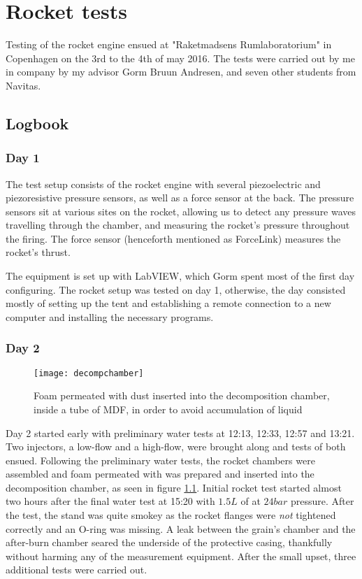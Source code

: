 \chapter{Rocket tests}

Testing of the rocket engine ensued at "Raketmadsens Rumlaboratorium" in Copenhagen on the 3rd to the 4th of may 2016. The tests were carried out by me in company by my advisor Gorm Bruun Andresen, and seven other students from Navitas.

\section{Logbook}

	\subsection{Day 1}

		The test setup consists of the rocket engine with several piezoelectric and piezoresistive pressure sensors, as well as a force sensor at the back. The pressure sensors sit at various sites on the rocket, allowing us to detect any pressure waves travelling through the chamber, and measuring the rocket's pressure throughout the firing. The force sensor (henceforth mentioned as ForceLink) measures the rocket's thrust.

		The equipment is set up with LabVIEW, which Gorm spent most of the first day configuring. The rocket setup was tested on day 1, otherwise, the day consisted mostly of setting up the tent and establishing a remote connection to a new computer and installing the necessary programs.

	\subsection{Day 2}

		\begin{figure}
			\centering
			\texttt{[image: decompchamber]}
			\caption{Foam permeated with  dust inserted into the decomposition chamber, inside a tube of MDF, in order to avoid accumulation of liquid }
			\label{fig:kmno4foam}
		\end{figure}

		Day 2 started early with preliminary water tests at 12:13, 12:33, 12:57 and 13:21. Two injectors, a low-flow and a high-flow, were brought along and tests of both ensued. Following the preliminary water tests, the rocket chambers were assembled and foam permeated with  was prepared and inserted into the decomposition chamber, as seen in figure \ref{fig:kmno4foam}. Initial rocket test started almost two hours after the final water test at 15:20 with $\si{1.5}{L}$ of  at $\si{24}{bar}$ pressure. After the test, the stand was quite smokey as the rocket flanges were \emph{not} tightened correctly and an O-ring was missing. A leak between the grain's chamber and the after-burn chamber seared the underside of the protective casing, thankfully without harming any of the measurement equipment. After the small upset, three additional tests were carried out. 

